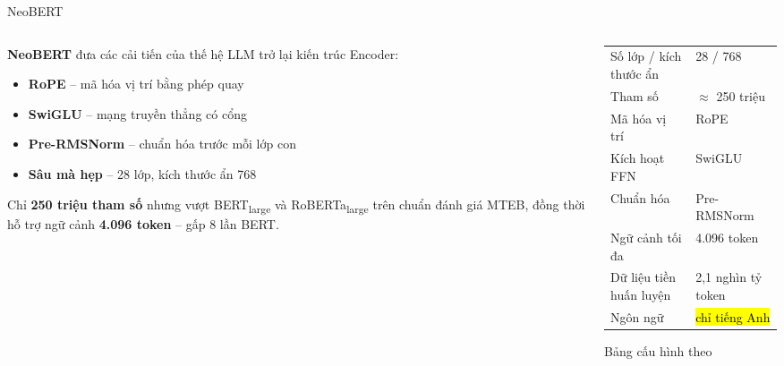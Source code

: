 \begin{frame}{NeoBERT}
\vspace{0.3em}
\begin{columns}[T]
\begin{column}{0.52\textwidth}
  \textbf{NeoBERT} đưa các cải tiến của thế hệ LLM
  trở lại kiến trúc Encoder:
  \begin{itemize}\itemsep2pt
    \item \textbf{RoPE} -- mã hóa vị trí bằng phép quay
    \item \textbf{SwiGLU} -- mạng truyền thẳng có cổng
    \item \textbf{Pre-RMSNorm} -- chuẩn hóa trước mỗi lớp con
    \item \textbf{Sâu mà hẹp} -- 28 lớp, kích thước ẩn 768
  \end{itemize}

  \vspace{0.4em}
  Chỉ \textbf{250 triệu tham số} nhưng vượt BERT\textsubscript{large} và
  RoBERTa\textsubscript{large} trên chuẩn đánh giá MTEB, đồng thời hỗ trợ
  ngữ cảnh \textbf{4.096 token} -- gấp 8 lần BERT.
\end{column}

\begin{column}{0.45\textwidth}
  \small
  \begin{tabular}{@{}l l@{}}
    \toprule
    \rowcolor{vnLight}\multicolumn{2}{@{}l@{}}{\bfseries\color{vnNavy} Cấu hình NeoBERT}\\
    \midrule
    Số lớp / kích thước ẩn & 28 / 768\\
    Tham số                & $\approx$ 250 triệu\\
    Mã hóa vị trí          & RoPE\\
    Kích hoạt FFN          & SwiGLU\\
    Chuẩn hóa              & Pre-RMSNorm\\
    Ngữ cảnh tối đa        & 4.096 token\\
    Dữ liệu tiền huấn luyện& 2,1 nghìn tỷ token\\
    Ngôn ngữ               & \hl{chỉ tiếng Anh}\\
    \bottomrule
  \end{tabular}
  \vspace{4pt}
  {\footnotesize\color{vnCite} Bảng cấu hình theo \citet{LeBreton2025}}
\end{column}
\end{columns}
\end{frame}


